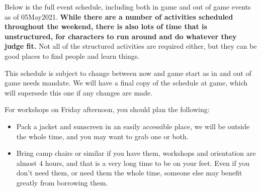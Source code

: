 \documentclass[green]{GL2020}
\begin{document}
\name{\gWeekendSchedule{}}

Below is the full event schedule, including both in game and out of game events as of 05May2021. \textbf{While there are a number of activities scheduled throughout the weekend, there is also lots of time that is unstructured, for characters to run around and do whatever they judge fit.} Not all of the structured activities are required either, but they can be good places to find people and learn things.

This schedule is subject to change between now and game start as in and out of game needs mandate. We will have a final copy of the schedule at game, which will supersede this one if any changes are made.


For workshops on Friday afternoon, you should plan the following:
\begin{itemize}
	\item Pack a jacket and sunscreen in an easily accessible place, we will be outside the whole time, and you may want to grab one or both.
	\item Bring camp chairs or similar if you have them, workshops and orientation are almost 4 hours, and that is a very long time to be on your feet. Even if you don’t need them, or need them the whole time, someone else may benefit greatly from borrowing them.
\end{itemize}
\end{document}
